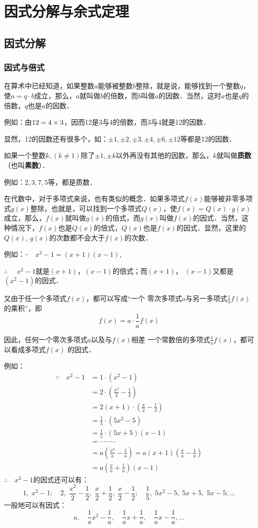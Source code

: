 \chapter{因式分解与余式定理}
\section{因式分解}
\subsection{因式与倍式}

在算术中已经知道，如果整数$a$能够被整数$b$整除，就是说，能够找到一个整数$q$，使$a=q\cdot b$成立，那么，$a$就叫做$b$的倍数，而$b$叫做$a$的因数．当然，这时$a$也是$q$的倍数，$q$也是$a$的因数．

例如：由$12=4\times3$，因而12是3与4的倍数，而3与4就是12的因数．

显然，12的因数还有很多个，如：$\pm1,\pm2,\pm3,\pm4,\pm6,\pm12$等都是12的因数．

如果一个整数$k, (k\ne 1)$除了$\pm1,\pm k$以外再没有其他的因数，那么，$k$就叫做\textbf{质数}（也叫\textbf{素数}）．

例如：$2, 3, 7, 5$等，都是质数．

在代数中，对于多项式来说，也有类似的概念．如果多项式$f(x)$能够被非零多项式$g(x)$整除，也就是，可以找到一个多项式$Q(x)$，使$f(x)=Q(x)\cdot g(x)$成立，那么，$f(x)$就叫做$g(x)$的倍式，而$g(x)$叫做$f(x)$的因式．当然，这种情况下，$f(x)$也是$Q(x)$的倍式，$Q(x)$也是$f(x)$的因式．显然，这里的$Q(x)$, $g(x)$的次数都不会大于$f(x)$的次数．

例如：$\because\quad x^2-1=(x+1)(x-1)$,

$\therefore\quad $ $x^2-1$就是$(x+1)$，$(x-1)$的倍式；而$(x+1)$，
$(x-1)$又都是$(x^2-1)$的因式．

又由于任一个多项式$f(x)$，都可以写成“一个
零次多项式$a$与另一多项式$\frac{1}{a}f(x)$的乘积”，即
\[f(x)=a\cdot \frac{1}{a}f(x)\]

因此，任何一个零次多项式$a$以及与$f(x)$相差
一个常数倍的多项式$\frac{1}{a}f(x)$，都可以看成多项式$f(x)$
的因式．

例如：\[\begin{split}
\because\quad x^2-1&= 1\cdot (x^2-1)\\
&=2\cdot \left(\frac{x^2}{2}-\frac{1}{2}\right)\\    
&=2(x+1)\cdot \left(\frac{x}{2}-\frac{1}{2}\right)\\
&=\frac{1}{5}\cdot (5x^2-5)\\
&=\frac{1}{5}\cdot (5x+5)(x-1)\\
&=\cdots \cdots \cdots \\
&=a\left(\frac{x^2}{a}-\frac{1}{a}\right)=a(x+1)\left(\frac{x}{a}-\frac{1}{a}\right)\\
&=a\left(\frac{x}{a}+\frac{1}{a}\right)(x-1)
\end{split}\]
$\therefore\quad x^2-1$的因式还可以有：
\[1,\; x^2-1;\quad 2,\; \frac{x^2}{2}-\frac{1}{2},\; \frac{x}{2}+\frac{1}{2},\; \frac{x}{2}-\frac{1}{2};\quad \frac{1}{5},\; 5x^2-5,\; 5x+5,\; 5x-5; \ldots \]
一般地可以有因式：
\[a,\quad \frac{1}{a}x^2-\frac{1}{a},\quad \frac{1}{a}x+\frac{1}{a},\quad \frac{1}{a}x-\frac{1}{a},\ldots\]

